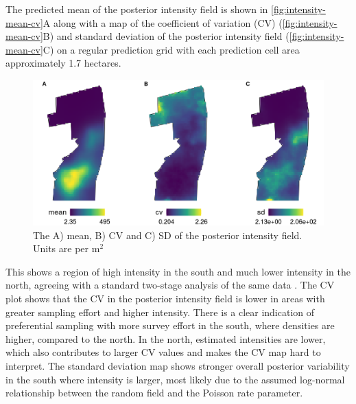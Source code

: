 \documentclass{stylefile16/statsoc}
\begin{document}
The predicted mean of the posterior intensity field is shown in \autoref{fig:intensity-mean-cv}A along with a map of the coefficient of variation (CV) (\autoref{fig:intensity-mean-cv}B) and standard deviation of the posterior intensity field (\autoref{fig:intensity-mean-cv}C) on a regular prediction grid with each prediction cell area approximately 1.7 hectares.
\begin{figure}[!htb]
	\begin{center}
		\includegraphics[scale=0.525]{figures/intensity_mean_cv_sd.png}
		\caption{The A) mean, B) CV and C) SD of the posterior intensity field.  Units are per m$^2$}
		\label{fig:intensity-mean-cv}
	\end{center}
\end{figure}
This shows a region of high intensity in the south and much lower intensity in the north, agreeing with a standard two-stage analysis of the same data \citep{camp_dsm_2020}.  The CV plot shows that the CV in the posterior intensity field is lower in areas with greater sampling effort and higher intensity.  There is a clear indication of preferential sampling with more survey effort in the south, where densities are higher, compared to the north.  In the north, estimated intensities are lower, which also contributes to larger CV values and makes the CV map hard to interpret.  The standard deviation map shows stronger overall posterior variability in the south where intensity is larger, most likely due to the assumed log-normal relationship between the random field and the Poisson rate parameter.  
\end{document}
